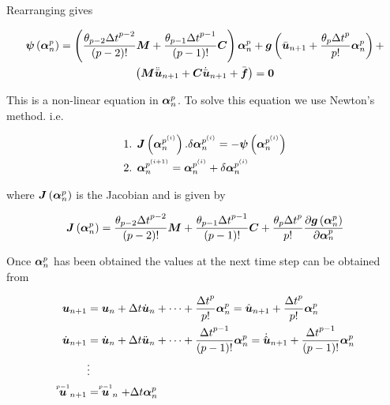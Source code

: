 Rearranging gives

\begin{multline}
  \fnof{\vect{\psi}}{\vect{\alpha}^{p}_{n}}=\pbrac{\dfrac{\theta_{p-2}{\Delta
        t}^{p-2}}{\factorial{p-2}}\matr{M}+\dfrac{\theta_{p-1}{\Delta
        t}^{p-1}}{\factorial{p-1}}\matr{C}}\vect{\alpha}^{p}_{n}+\fnof{\vect{g}}{\bar{\vect{u}}_{n+1}+\dfrac{\theta_{p}{\Delta
        t}^{p}}{p!}\vect{\alpha}^{p}_{n}}+ \\
  \pbrac{\matr{M}\ddot{\bar{\vect{u}}}_{n+1}+\matr{C}\dot{\bar{\vect{u}}}_{n+1}+
    \bar{\vect{f}}}= \vect{0}
\end{multline}

This is a non-linear equation in $\vect{\alpha}^{p}_{n}$. To solve this
equation we use Newton's method. i.e.

\begin{equation}
  \begin{split}
    \text{1.  } & \fnof{\matr{J}}{\vect{\alpha}^{p^{(i)}}_{n}}.\delta
    \vect{\alpha}^{p^{(i)}}_{n} = -\fnof{\vect{\psi}}{\vect{\alpha}^{p^{(i)}}_{n}}
    \\
    \text{2.  } & \vect{\alpha}^{p^{(i+1)}}_{n}=\vect{\alpha}^{p^{(i)}}_{n}+\delta
    \vect{\alpha}^{p^{(i)}}_{n}
  \end{split}
\end{equation}

where $\fnof{\matr{J}}{\vect{\alpha}^{p}_{n}}$ is the Jacobian and is given by

\begin{equation}
  \fnof{\matr{J}}{\vect{\alpha}^{p}_{n}}=\dfrac{\theta_{p-2}{\Delta t}^{p-2}}{\factorial{p-2}}\matr{M}+\dfrac{\theta_{p-1}{\Delta
      t}^{p-1}}{\factorial{p-1}}\matr{C}+\dfrac{\theta_{p}{\Delta t}^{p}}{p!}
  \delby{\fnof{\vect{g}}{\vect{\alpha}^{p}_{n}}}{\vect{\alpha}^{p}_{n}}
\end{equation}

Once $\vect{\alpha}^{p}_{n}$ has been obtained the values at the next time
step can be obtained from

\begin{equation}
  \begin{split}
    \vect{u}_{n+1} &= \vect{u}_{n}+\Delta t
    \dot{\vect{u}}_{n}+\cdots+\dfrac{{\Delta t}^{p}}{p!}\vect{\alpha}^{p}_{n}=\hat{\vect{u}}_{n+1}+\dfrac{{\Delta t}^{p}}{p!}\vect{\alpha}^{p}_{n}\\
    \dot{\vect{u}}_{n+1} &= \dot{\vect{u}}_{n}+\Delta t
    \ddot{\vect{u}}_{n}+\cdots+\dfrac{{\Delta
        t}^{p-1}}{\factorial{p-1}}\vect{\alpha}^{p}_{n}=\dot{\hat{\vect{u}}}_{n+1}+\dfrac{{\Delta
        t}^{p-1}}{\factorial{p-1}}\vect{\alpha}^{p}_{n} \\
    &\vdots \\
    \symover{p-1}{\vect{u}}_{n+1} &= \symover{p-1}{\vect{u}}_{n}+\Delta t\vect{\alpha}^{p}_{n}
  \end{split}
\end{equation}
